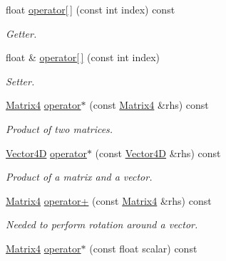 \begin{DoxyCompactItemize}
float \mbox{\hyperlink{class_matrix4_a6ff99e9b78c07a013f82e1cd38d45eef}{operator\mbox{[}$\,$\mbox{]}}} (const int index) const
\begin{DoxyCompactList}\small\item\em Getter. \end{DoxyCompactList}\item 
\mbox{\label{class_matrix4_a9da82ca6629a842362a5c646e1c812fb}} 
float \& \mbox{\hyperlink{class_matrix4_a9da82ca6629a842362a5c646e1c812fb}{operator\mbox{[}$\,$\mbox{]}}} (const int index)
\begin{DoxyCompactList}\small\item\em Setter. \end{DoxyCompactList}\item 
\mbox{\label{class_matrix4_ace5fb62ba207d9b1ac7ab7a366957f60}} 
\mbox{\hyperlink{class_matrix4}{Matrix4}} \mbox{\hyperlink{class_matrix4_ace5fb62ba207d9b1ac7ab7a366957f60}{operator$\ast$}} (const \mbox{\hyperlink{class_matrix4}{Matrix4}} \&rhs) const
\begin{DoxyCompactList}\small\item\em Product of two matrices. \end{DoxyCompactList}\item 
\mbox{\label{class_matrix4_afec465e9fdefc5d69062efbbe5f5446a}} 
\mbox{\hyperlink{class_vector4_d}{Vector4D}} \mbox{\hyperlink{class_matrix4_afec465e9fdefc5d69062efbbe5f5446a}{operator$\ast$}} (const \mbox{\hyperlink{class_vector4_d}{Vector4D}} \&rhs) const
\begin{DoxyCompactList}\small\item\em Product of a matrix and a vector. \end{DoxyCompactList}\item 
\mbox{\hyperlink{class_matrix4}{Matrix4}} \mbox{\hyperlink{class_matrix4_a61b8f5a2f89ae56c43b91e750ae6e580}{operator+}} (const \mbox{\hyperlink{class_matrix4}{Matrix4}} \&rhs) const
\begin{DoxyCompactList}\small\item\em Needed to perform rotation around a vector. \end{DoxyCompactList}\item 
\mbox{\label{class_matrix4_ad348ae172508538bc282895b964296f1}} 
\mbox{\hyperlink{class_matrix4}{Matrix4}} \mbox{\hyperlink{class_matrix4_ad348ae172508538bc282895b964296f1}{operator$\ast$}} (const float scalar) const

\end{DoxyCompactItemize}
